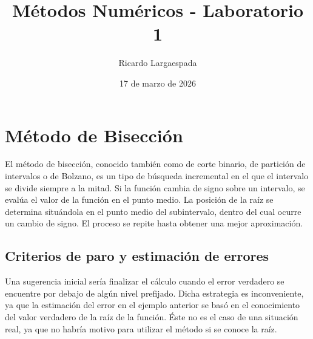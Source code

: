 \documentclass[12pt,letterpaper]{article}
\theoremstyle{definition}
\theoremstyle{plain}
\theoremstyle{remark}
\begin{document}
\author{Ricardo Largaespada}
\title{Métodos Numéricos - Laboratorio 1}
\date{17 de marzo de 2026}
\maketitle


\section{Método de Bisección}
El método de bisección, conocido también como de corte binario, de partición de intervalos o de Bolzano, es un tipo de búsqueda incremental en el que el intervalo se divide siempre a la mitad. Si la función cambia de signo sobre un intervalo, se evalúa el valor de la función en el punto medio. La posición de la raíz se determina situándola en el punto medio del subintervalo, dentro del cual ocurre un cambio de signo. El proceso se repite hasta obtener una mejor aproximación.

\subsection{Criterios de paro y estimación de errores}
Una sugerencia inicial sería finalizar el cálculo cuando el error verdadero se encuentre por debajo de algún nivel prefijado. Dicha estrategia es inconveniente, ya que la estimación del error en el ejemplo anterior se basó en el conocimiento del valor verdadero de la raíz de la función. Éste no es el caso de una situación real, ya que no habría motivo para utilizar el método si se conoce la raíz.\\
\end{document}
